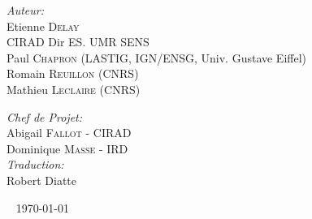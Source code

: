 \begin{titlepage}
\begin{center}
\begin{minipage}{0.4\textwidth}
\begin{flushleft} \large
\emph{\textcolor{gris}{Auteur:}}\\
Etienne \textsc{Delay}\\
\textcolor{vert}{CIRAD Dir ES. UMR SENS}\\
Paul \textsc{Chapron} (LASTIG, IGN/ENSG, Univ. Gustave Eiffel)\\
Romain \textsc{Reuillon} (CNRS)\\
Mathieu \textsc{Leclaire} (CNRS)
\end{flushleft}
\end{minipage}
\begin{minipage}{0.4\textwidth}
\begin{flushright} \large
\emph{\textcolor{gris}{Chef de Projet:}} \\
Abigail \textsc{Fallot} - CIRAD\\
Dominique \textsc{Masse} - IRD\\
\vspace{2em}
\emph{\textcolor{gris}{Traduction:}} \\
Robert Diatte
\end{flushright}
\end{minipage}

\vfill

\logoRF ~ \partnerFr
{\large \today}

\end{center}
\end{titlepage}
